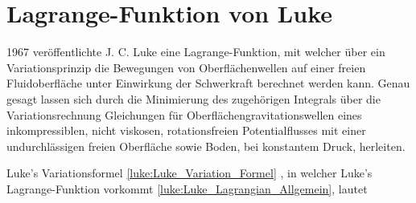 %
%
%
%

\section{Lagrange-Funktion von Luke\label{luke:section:Luke_Lagrangian}}

1967 veröffentlichte J. C. Luke \cite{luke:Luke1967} eine Lagrange-Funktion, mit welcher über ein Variationsprinzip die Bewegungen von Oberflächenwellen auf einer freien Fluidoberfläche unter Einwirkung der Schwerkraft berechnet werden kann.
Genau gesagt lassen sich durch die Minimierung des zugehörigen Integrals über die Variationsrechnung Gleichungen für Oberflächengravitationswellen eines inkompressiblen, nicht viskosen, rotationsfreien Potentialflusses mit einer undurchlässigen freien Oberfläche sowie Boden, bei konstantem Druck, herleiten.
%
%
%
%

Luke's Variationsformel \eqref{luke:Luke_Variation_Formel} , in welcher Luke's Lagrange-Funktion vorkommt \eqref{luke:Luke_Lagrangian_Allgemein}, lautet


